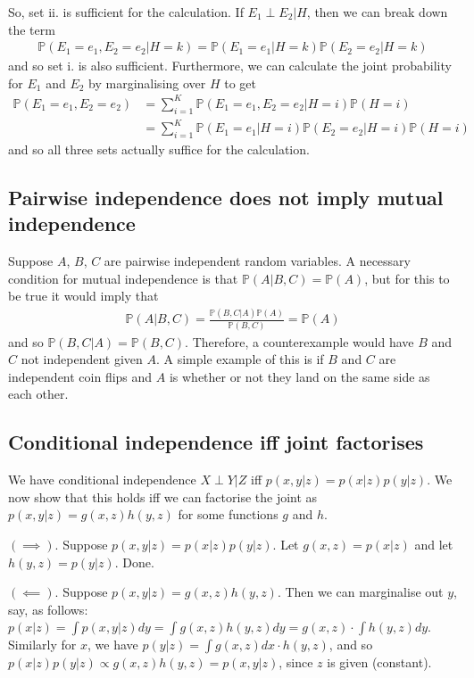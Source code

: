 \documentclass{article}
\begin{document}
So, set ii. is sufficient for the calculation. If $E_1 \perp E_2|H$, then we can break down the term
\begin{gather*}
\mathbb{P}(E_1=e_1,E_2=e_2|H=k) = \mathbb{P}(E_1=e_1|H=k)\mathbb{P}(E_2=e_2|H=k)
\end{gather*}
and so set i. is also sufficient. Furthermore, we can calculate the joint probability for $E_1$ and $E_2$ by marginalising over $H$ to get
\begin{align*}
\mathbb{P}(E_1=e_1,E_2=e_2) &= \sum_{i=1}^{K} \mathbb{P}(E_1=e_1,E_2=e_2|H=i)\mathbb{P}(H=i)\\
&= \sum_{i=1}^{K} \mathbb{P}(E_1=e_1|H=i)\mathbb{P}(E_2=e_2|H=i)\mathbb{P}(H=i)
\end{align*}
and so all three sets actually suffice for the calculation.

\subsection{Pairwise independence does not imply mutual independence}
Suppose $A$, $B$, $C$ are pairwise independent random variables. A necessary condition for mutual independence is that $\mathbb{P}(A|B,C) = \mathbb{P}(A)$, but for this to be true it would imply that
\begin{gather*}
\mathbb{P}(A|B,C) = \frac{\mathbb{P}(B,C|A)\mathbb{P}(A)}{\mathbb{P}(B,C)} = \mathbb{P}(A)
\end{gather*}
and so $\mathbb{P}(B,C|A) = \mathbb{P}(B,C)$. Therefore, a counterexample would have $B$ and $C$ not independent given $A$. A simple example of this is if $B$ and $C$ are independent coin flips and $A$ is whether or not they land on the same side as each other.

\subsection{Conditional independence iff joint factorises}
We have conditional independence $X \perp Y | Z$ iff $p(x,y|z) = p(x|z)p(y|z)$. We now show that this holds iff we can factorise the joint as $p(x,y|z) = g(x,z)h(y,z)$ for some functions $g$ and $h$.

$(\implies).$ Suppose $p(x,y|z) = p(x|z)p(y|z)$. Let $g(x,z) = p(x|z)$ and let $h(y,z) = p(y|z)$. Done.

$(\impliedby).$ Suppose $p(x,y|z) = g(x,z)h(y,z)$. Then we can marginalise out $y$, say, as follows: $p(x|z) = \int p(x,y|z) dy = \int g(x,z)h(y,z) dy = g(x,z) \cdot \int h(y,z) dy$. Similarly for $x$, we have $p(y|z) = \int g(x,z) dx \cdot h(y,z)$, and so $p(x|z)p(y|z) \propto g(x,z)h(y,z) = p(x,y|z)$, since $z$ is given (constant).
\end{document}
